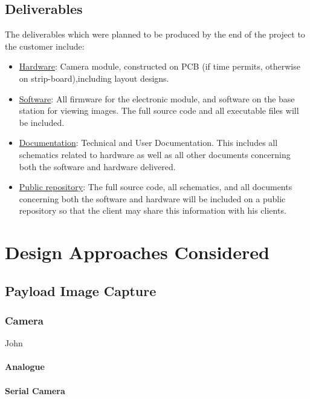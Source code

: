 \documentclass[oneside]{ecsgdp}         %
\begin{document}
\section{Deliverables}
The deliverables which were planned to be produced by the end of the project to the customer include:
\begin{itemize}
	\item \underline{Hardware}: Camera module, constructed on PCB (if time permits, otherwise on strip-board),including layout designs.
	\item \underline{Software}: All firmware for the electronic module, and software on the base station for viewing images. The full source code and all executable files will be included.
	\item \underline{Documentation}: Technical and User Documentation. This includes all schematics related to hardware as well as all other documents concerning both the software and hardware delivered.
	\item \underline{Public repository}: The full source code, all schematics, and all documents concerning both the software and hardware will be included on a public repository so that the client may share this information with his clients.
\end{itemize}

\chapter{Design Approaches Considered}

\section{Payload Image Capture}

\subsection{Camera}
John

\subsubsection{Analogue}

\subsubsection{Serial Camera}
\end{document}
